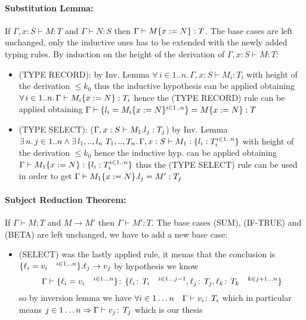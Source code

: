 \paragraph*{Substitution Lemma:\\}
If \(\Gamma, x: S \vdash M: T\) and \(\Gamma \vdash N: S\) then \(\Gamma
\vdash M\{x:=N\}: T\).  The base cases are left unchanged, only the
inductive ones has to be extended with the newly added typing rules.
By induction on the height of the derivation of \(\Gamma, x: S \vdash
M: T\):
\begin{itemize}
\item (TYPE RECORD): by Inv. Lemma \(\forall\, i \in 1..n.\, \Gamma,
  x: S \vdash M_i: T_i\) with height of the derivation \(\le k_0\)
  thus the inductive hypothesis can be applied obtaining\\ \(\forall\,
  i \in 1..n.\, \Gamma \vdash M_i\{x:=N\}: T_i\) hence the (TYPE
  RECORD) rule can be applied obtaining \(\Gamma \vdash
  \{l_i=M_i\{x:=N\}^{i \in 1..n}\}= M\{x:=N\}: T\)
\item (TYPE SELECT): (\(\Gamma, x: S \vdash M_1.l_j: T_j\)) by
  Inv. Lemma\\ \(\exists\, n.\, j \in 1..n \wedge \exists\,
  l_1,..,l_n\ T_1,..,T_n.\, \Gamma, x: S \vdash M_1 : \{l_i:
    T_i^{i \in 1..n}\}\) with height of the derivation \(\le k_0\)
  hence the inductive hyp. can be applied obtaining \(\Gamma \vdash
  M_1\{x:=N\} : \{l_i: T_i^{i \in 1..n}\}\) thus the (TYPE
  SELECT) rule can be used in order to get \(\Gamma \vdash
  M_1\{x:=N\}.l_j = M': T_j\)
\end{itemize}


\paragraph*{Subject Reduction Theorem:\\}

If \(\Gamma \vdash M: T\) and \(M \to M'\) then \(\Gamma \vdash M':
T\).  The base cases (SUM), (IF-TRUE) and (BETA) are left unchanged,
we have to add a new base case:
\begin{itemize}
\item (SELECT) was the lastly applied rule, it menas that the
  conclusion is \(\{\ell_i = v_i \quad^{i\in 1\dots n}\}.\ell_j \to
  v_j\) by hypothesis we know \[\Gamma \vdash \{\ell_i = v_i
    \quad^{i\in 1\dots n}\} \!:\,\{\ell_i \!:\,T_i \quad^{i\in
        1\dots j-1}, \ell_j \!:\,T_j, \ell_k \!:\,T_k \quad^{k\in
        j+1\dots n}\}\] so by inversion lemma we have \(\forall i \in
  1 \dots n \quad \Gamma\vdash v_i\!:\,T_i\) which in particular
  means \(j\in 1\dots n \Rightarrow \Gamma \vdash v_j \!:\,T_j\)
  which is our thesis
\end{itemize}

